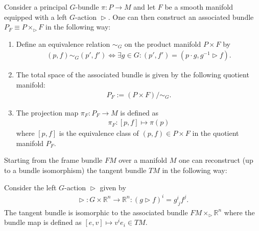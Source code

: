     \begin{construct}\label{diff:prin:associated_bundle}
        Consider a principal $G$-bundle $\pi:P\rightarrow M$ and let $F$ be a smooth manifold equipped with a left $G$-action $\vartriangleright$. One can then construct an associated bundle $P_F \equiv P \times_\vartriangleright F$ in the following way:
        \begin{enumerate}
            \item Define an equivalence relation $\sim_G$ on the product manifold $P\times F$ by
                \begin{gather}
                    \label{diff:associated_bundle_equivalence}
                    (p, f)\sim_G (p', f')\iff \exists g\in G: (p',f') = (p\cdot g, g^{-1}\vartriangleright f).
                \end{gather}
            \item The total space of the associated bundle is given by the following quotient manifold:
                \begin{gather}
                    P_F := (P\times F)/\sim_G.
                \end{gather}
            \item The projection map $\pi_F:P_F\rightarrow M$ is defined as
                \begin{gather}
                    \pi_F:[p,f]\mapsto \pi(p)
                \end{gather}
            where $[p,f]$ is the equivalence class of $(p,f)\in P\times F$ in the quotient manifold $P_F$.
        \end{enumerate}
    \end{construct}

    \begin{example}
        Starting from the frame bundle $FM$ over a manifold $M$ one can reconstruct (up to a bundle isomorphism) the tangent bundle $TM$ in the following way:

        Consider the left $G$-action $\vartriangleright$ given by
        \begin{gather}
            \vartriangleright:G\times\mathbb{R}^n\rightarrow\mathbb{R}^n : (g\vartriangleright f)^i = g^i_{\ j}f^j.
        \end{gather}
        The tangent bundle is isomorphic to the associated bundle $FM\times_\vartriangleright\mathbb{R}^n$ where the bundle map is defined as $[e,v]\mapsto v^ie_i \in TM$.
    \end{example}

